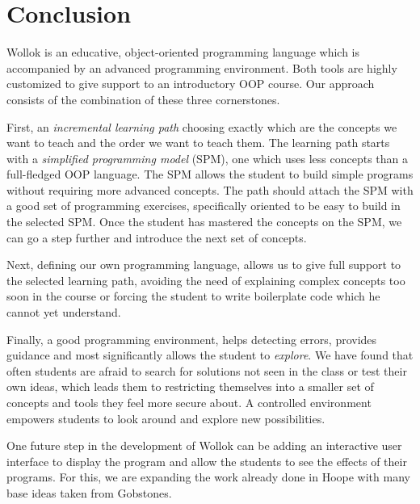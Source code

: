 \section{Conclusion}
\label{sec:conclusion}



Wollok is an educative, object-oriented programming language which is accompanied by an advanced programming environment.
Both tools are highly customized to give support to an introductory OOP course.
Our approach consists of the combination of these three cornerstones.

First, an \emph{incremental learning path} choosing exactly which are the concepts we want to teach and the order we want to teach them.
The learning path starts with a \emph{simplified programming model} (SPM), \ie one which uses less concepts than a full-fledged OOP language.
The SPM allows the student to build simple programs without requiring more advanced concepts.
The path should attach the SPM with a good set of programming exercises, specifically oriented to be easy to build in the selected SPM.
Once the student has mastered the concepts on the SPM, we can go a step further and introduce the next set of concepts.

Next, defining our own programming language, allows us to give full support to the selected learning path, 
avoiding the need of explaining complex concepts too soon in the course or forcing the student to write boilerplate code which he cannot yet understand.

Finally, a good programming environment, helps detecting errors, provides guidance and most significantly allows the student to \emph{explore}.
We have found that often students are afraid to search for solutions not seen in the class or test their own ideas, 
which leads them to restricting themselves into a smaller set of concepts and tools they feel more secure about.
A controlled environment empowers students to look around and explore new possibilities.

\medskip


\label{sec:furtherWork}

One future step in the development of Wollok can be adding an interactive user interface to display the program and allow the students to see the effects of their programs. For this, we are expanding the work already done in Hoope with many base ideas taken from Gobstones. 

